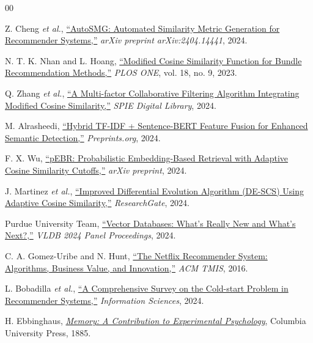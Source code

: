 \documentclass[journal]{IEEEtran}
\begin{document}
\begin{thebibliography}{00}

Z. Cheng \textit{et al.}, \href{https://arxiv.org/abs/2404.14441}{``AutoSMG: Automated Similarity Metric Generation for Recommender Systems,''} \textit{arXiv preprint arXiv:2404.14441}, 2024.

N. T. K. Nhan and L. Hoang, \href{https://doi.org/10.1371/journal.pone.0291125}{``Modified Cosine Similarity Function for Bundle Recommendation Methods,''} \textit{PLOS ONE}, vol. 18, no. 9, 2023.

Q. Zhang \textit{et al.}, \href{https://doi.org/10.1117/12.3021543}{``A Multi-factor Collaborative Filtering Algorithm Integrating Modified Cosine Similarity,''} \textit{SPIE Digital Library}, 2024.

M. Alrasheedi, \href{https://www.preprints.org/manuscript/202409.1211/v1}{``Hybrid TF-IDF + Sentence-BERT Feature Fusion for Enhanced Semantic Detection,''} \textit{Preprints.org}, 2024.

F. X. Wu, \href{https://arxiv.org/abs/2409.07432}{``pEBR: Probabilistic Embedding-Based Retrieval with Adaptive Cosine Similarity Cutoffs,''} \textit{arXiv preprint}, 2024.

J. Martinez \textit{et al.}, \href{https://www.researchgate.net/publication/383125431}{``Improved Differential Evolution Algorithm (DE-SCS) Using Adaptive Cosine Similarity,''} \textit{ResearchGate}, 2024.

Purdue University Team, \href{https://vldb.org/pvldb/vol17/p4356-purdue.pdf}{``Vector Databases: What's Really New and What's Next?,''} \textit{VLDB 2024 Panel Proceedings}, 2024.

C. A. Gomez-Uribe and N. Hunt, \href{https://doi.org/10.1145/2843948}{``The Netflix Recommender System: Algorithms, Business Value, and Innovation,''} \textit{ACM TMIS}, 2016.

L. Bobadilla \textit{et al.}, \href{https://doi.org/10.1016/j.ins.2023.119289}{``A Comprehensive Survey on the Cold-start Problem in Recommender Systems,''} \textit{Information Sciences}, 2024.

H. Ebbinghaus, \href{https://psychclassics.yorku.ca/Ebbinghaus/index.htm}{\textit{Memory: A Contribution to Experimental Psychology}}, Columbia University Press, 1885.


\end{thebibliography}
\end{document}
